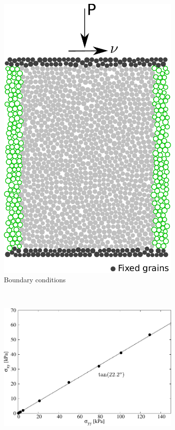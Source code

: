 \begin{figure}
\centering
\begin{subfigure}[b]{0.5\textwidth}
\centering
\includegraphics[width=\textwidth]{simple_shear}
\caption{Boundary conditions}
\label{fig:shear}
\end{subfigure}\\
\begin{subfigure}[b]{0.65\textwidth}
\centering
\includegraphics[width=\textwidth]{Sxy_vs_Syy}

\end{subfigure}
\end{figure}
